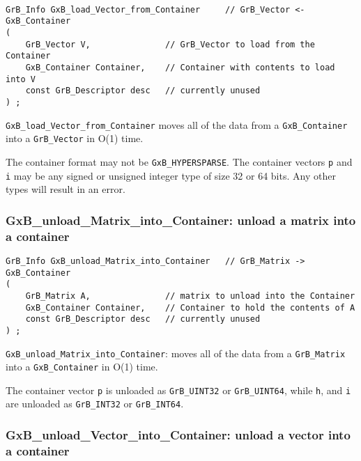 \begin{mdframed}[userdefinedwidth=6in]
{\footnotesize
\begin{verbatim}

GrB_Info GxB_load_Vector_from_Container     // GrB_Vector <- GxB_Container
(
    GrB_Vector V,               // GrB_Vector to load from the Container
    GxB_Container Container,    // Container with contents to load into V
    const GrB_Descriptor desc   // currently unused
) ;
\end{verbatim}
} \end{mdframed}

\verb'GxB_load_Vector_from_Container' moves all of the data from a
\verb'GxB_Container' into a \verb'GrB_Vector' in O(1) time.

The container format may not be \verb'GxB_HYPERSPARSE'.
The container vectors \verb'p' and \verb'i' may be any signed or
unsigned integer type of size 32 or 64 bits.  Any other types will result in
an error.

\newpage
\subsubsection{{\sf GxB\_unload\_Matrix\_into\_Container:} unload a matrix into a container}
\label{unload_matrix_into_container}

\begin{mdframed}[userdefinedwidth=6in]
{\footnotesize
\begin{verbatim}
GrB_Info GxB_unload_Matrix_into_Container   // GrB_Matrix -> GxB_Container
(
    GrB_Matrix A,               // matrix to unload into the Container
    GxB_Container Container,    // Container to hold the contents of A
    const GrB_Descriptor desc   // currently unused
) ;
\end{verbatim}
} \end{mdframed}

\verb'GxB_unload_Matrix_into_Container': moves all of the data from
a \verb'GrB_Matrix' into a \verb'GxB_Container' in O(1) time.

The container vector \verb'p' is unloaded as \verb'GrB_UINT32' or \verb'GrB_UINT64',
while \verb'h', and \verb'i' are unloaded as \verb'GrB_INT32' or \verb'GrB_INT64'.

\subsubsection{{\sf GxB\_unload\_Vector\_into\_Container:} unload a vector into a container}
\label{unload_vector_into_container}

